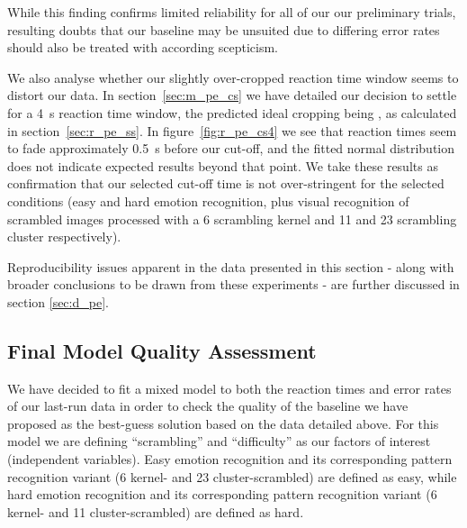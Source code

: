 	    While this finding confirms limited reliability for all of our our preliminary trials, resulting doubts that our baseline may be unsuited due to differing error rates should also be treated with according scepticism.
	    
	    We also analyse whether our slightly over-cropped reaction time window seems to distort our data.
	    In section~\ref{sec:m_pe_cs} we have detailed our decision to settle for a \SI{4}{\second} reaction time window, the predicted ideal cropping being , as calculated in section~\ref{sec:r_pe_ss}.
	    In figure~\ref{fig:r_pe_cs4} we see that reaction times seem to fade approximately \SI{0.5}{\second} before our cut-off, and the fitted normal distribution does not indicate expected results beyond that point.
	    We take these results as confirmation that our selected cut-off time is not over-stringent for the selected conditions (easy and hard emotion recognition, plus visual recognition of scrambled images processed with a \SI{6}{\pixel} scrambling kernel and \SI{11}{\pixel} and \SI{23}{\pixel} scrambling cluster respectively).	    
	    
	    Reproducibility issues apparent in the data presented in this section - along with broader conclusions to be drawn from these experiments - are further discussed in section \ref{sec:d_pe}.
	    
	\subsection{Final Model Quality Assessment}
	    We have decided to fit a mixed model to both the reaction times and error rates of our last-run data in order to check the quality of the baseline we have proposed as the best-guess solution based on the data detailed above.
	    For this model we are defining “scrambling” and “difficulty” as our factors of interest (independent variables).
	    Easy emotion recognition and its corresponding pattern recognition variant (\SI{6}{\pixel} kernel- and \SI{23}{\pixel} cluster-scrambled) are defined as easy,
	    while hard emotion recognition and its corresponding pattern recognition variant (\SI{6}{\pixel} kernel- and \SI{11}{\pixel} cluster-scrambled) are defined as hard.
	    
